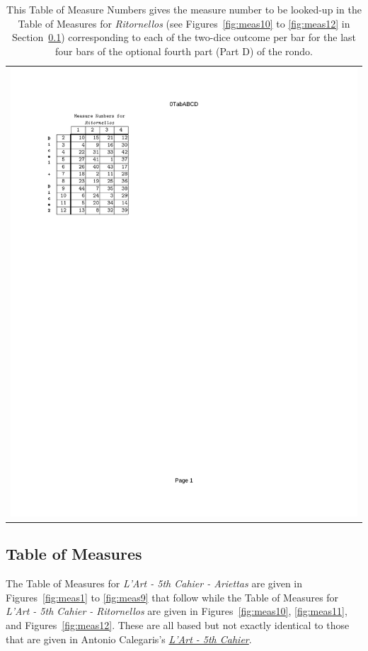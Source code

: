 \documentclass[a4paper,x11names,svgnames,10pt]{article}
\begin{document}
{\begin{table}[H]
	\centering
	\begin{tabular}{c}
		\centering
		\includegraphics[clip=true,trim=0.75in 7.30in 5.25in 1.00in,scale=0.90]{0TAB-R}
	\end{tabular}
	\caption{This Table of Measure Numbers gives the measure number to be looked-up in the Table of Measures for {\it Ritornellos} (see Figures~\ref{fig:meas10} to \ref{fig:meas12} in Section~\ref{tabMeas}) corresponding to each of the two-dice outcome per bar for the last four bars of the optional fourth part (Part D) of the rondo.}
	\label{tab:find4}
\end{table}


\subsection{Table of Measures}\label{tabMeas}

The Table of Measures for {\em L'Art - 5th Cahier - Ariettas} are given in Figures~\ref{fig:meas1} to \ref{fig:meas9} that follow while the  Table of Measures for {\em L'Art - 5th Cahier - Ritornellos} are given in Figures~\ref{fig:meas10}, \ref{fig:meas11}, and Figures~\ref{fig:meas12}.  These are all based but not exactly identical to those that are given in Antonio Calegaris's \href{https://imslp.org/wiki/L'art\_de_composer\_de\_la_musique\_sans\_en\_conna\%C3\%AEtre\_les\_\%C3\%A9l\%C3\%A9ments\_(Calegari\%2C\_Antonio)}{{\em L'Art - 5th Cahier}}.

}
\end{document}
